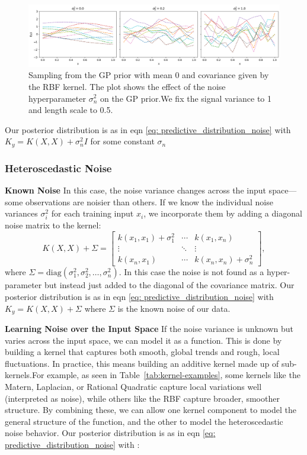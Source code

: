 \documentclass[11pt]{article}
\begin{document}
\begin{figure}[H]
    \centering
        \includegraphics[width=\textwidth]{LatexPlots/1dplots/Kernel_noise.png}
        \caption{Sampling from the GP prior with mean 0 and covariance given by the RBF kernel.
        The plot shows the effect of the noise hyperparameter \(\sigma_n^2\) on the GP prior.We fix the signal variance to 1 and length scale to 0.5.}
    \label{fig: kernel_noise}
\end{figure}
\noindent
Our posterior distribution is as in eqn \ref{eq:  predictive_distribution_noise} with \(K_y = K(X, X) + \sigma_n^2 I \) for some constant \(\sigma_n\)


\subsubsection*{Heteroscedastic Noise}  
\textbf{Known Noise}
\noindent
In this case, the noise variance changes across the input space—some observations are noisier than others. If we know the individual noise variances \( \sigma_i^2 \) for each training input \( x_i \), we incorporate them by adding a diagonal noise matrix to the kernel:
\[
K(X, X) + \Sigma = 
\begin{bmatrix}
k(x_1, x_1) + \sigma_1^2 & \cdots & k(x_1, x_n) \\
\vdots & \ddots & \vdots \\
k(x_n, x_1) & \cdots & k(x_n, x_n) + \sigma_n^2
\end{bmatrix},
\]
where \( \Sigma = \text{diag}(\sigma_1^2, \sigma_2^2, \dots, \sigma_n^2) \).
In this case the noise is not found as a hyper-parameter but instead just added to the diagonal of the covariance matrix.
Our posterior distribution is as in eqn \ref{eq:  predictive_distribution_noise} with \(K_y =K(X, X) + \Sigma \) where \(\Sigma\) is the known noise of our data. 

\vspace{1em}
\noindent
\textbf{Learning Noise over the Input Space}
\noindent
If the noise variance is unknown but varies across the input space, we can model it as a function. 
This is done by building a kernel that captures both smooth, global trends and rough, local fluctuations. 
In practice, this means building an additive kernel made up of sub-kernels.For example, as seen in Table~\ref{tab:kernel-examples}, some kernels like the Matern, Laplacian, or Rational Quadratic capture local variations well (interpreted as noise),
while others like the RBF capture broader, smoother structure. By combining these, we can allow one kernel component to model the general structure of the function, and the other to model the heteroscedastic noise behavior. 
Our posterior distribution is as in eqn \ref{eq:  predictive_distribution_noise} with :
\end{document}
